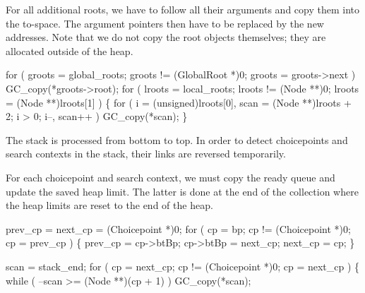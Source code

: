 \nwendcode{}\nwdocspar
For all additional roots, we have to follow all their arguments and
copy them into the to-space. The argument pointers then have to be
replaced by the new addresses. Note that we do not copy the root
objects themselves; they are allocated outside of the heap.

\nwenddocs{}\endmoddef\nwstartdeflinemarkup{}\nwenddeflinemarkup
for ( groots = global_roots; groots != (GlobalRoot *)0; groots = groots->next )
    GC_copy(*groots->root);
for ( lroots = local_roots; lroots != (Node **)0; lroots = (Node **)lroots[1] )
\{
    for ( i = (unsigned)lroots[0], scan = (Node **)lroots + 2;
          i > 0;
          i--, scan++ )
        GC_copy(*scan);
\}

\nwendcode{}\nwdocspar
The stack is processed from bottom to top. In order to detect
choicepoints and search contexts in the stack, their links are
reversed temporarily.

For each choicepoint and search context, we must copy the ready queue
and update the saved heap limit. The latter is done at the end of the
collection where the heap limits are reset to the end of the heap.

\nwenddocs{}\plusendmoddef\nwstartdeflinemarkup{}\nwenddeflinemarkup
prev_cp = next_cp = (Choicepoint *)0;
for ( cp = bp; cp != (Choicepoint *)0; cp = prev_cp )
\{
    prev_cp  = cp->btBp;
    cp->btBp = next_cp;
    next_cp  = cp;
\}

scan = stack_end;
for ( cp = next_cp; cp != (Choicepoint *)0; cp = next_cp )
\{
    while ( --scan >= (Node **)(cp + 1) )
        GC_copy(*scan);

